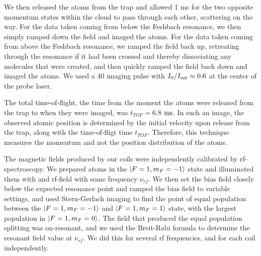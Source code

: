 \documentclass[12pt]{iopart}
\begin{document}
\par We then released the atoms from the trap and allowed 1 ms for the two opposite momentum states within the cloud to pass through each other, scattering on the way. For the data taken coming from below the Feshbach resonance, we then simply ramped down the field and imaged the atoms. For the data taken coming from above the Feshbach resonance, we ramped the field back up, retreating through the resonance if it had been crossed and thereby dissociating any molecules that were created, and then quickly ramped the field back down and imaged the atoms. We used a 40 \us{} imaging pulse with $I_0/I_{\rm{sat}}\approx 0.6$ at the center of the probe laser.
\par The total time-of-flight, the time from the moment the atoms were released from the trap to when they were imaged, was $t_{TOF}=6.8$ $\rm{ms}$. In such an image, the observed atomic position is determined by the initial velocity upon release from the trap, along with the time-of-fligt time $t_{TOF}$. Therefore, this technique measures the momentum and not the position distribution of the atoms.
\par The magnetic fields produced by our coils were independently calibrated by rf-spectroscopy. We prepared \Rb{} atoms in the $\mathinner{|{F=1, m_F=-1}\rangle}$ state and illuminated them with and rf-field with some frequency $\nu_{rf}$. We then set the bias field closely below the expected resonance point and ramped the bias field to variable settings, and used Stern-Gerlach imaging to find the point of equal population between the $\mathinner{|{F=1, m_F=-1}\rangle}$  and $\mathinner{|{F=1, m_F=1}\rangle}$ state, with the largest population in $\mathinner{|{F=1, m_F=0}\rangle}$. The field that produced the equal population splitting was on-resonant, and we used the Breit-Rabi formula to determine the resonant field value at $\nu_{rf}$. We did this for several rf frequencies, and for each coil independently.
\end{document}
